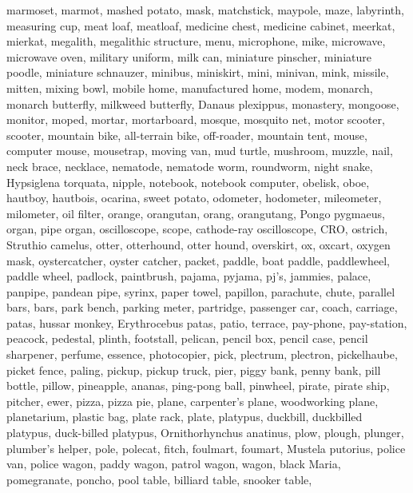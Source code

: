 \documentclass{article}
\begin{document}
{{marmoset},
{marmot},
{mashed potato},
{mask},
{matchstick},
{maypole},
{maze, labyrinth},
{measuring cup},
{meat loaf, meatloaf},
{medicine chest, medicine cabinet},
{meerkat, mierkat},
{megalith, megalithic structure},
{menu},
{microphone, mike},
{microwave, microwave oven},
{military uniform},
{milk can},
{miniature pinscher},
{miniature poodle},
{miniature schnauzer},
{minibus},
{miniskirt, mini},
{minivan},
{mink},
{missile},
{mitten},
{mixing bowl},
{mobile home, manufactured home},
{modem},
{monarch, monarch butterfly, milkweed butterfly, Danaus plexippus},
{monastery},
{mongoose},
{monitor},
{moped},
{mortar},
{mortarboard},
{mosque},
{mosquito net},
{motor scooter, scooter},
{mountain bike, all-terrain bike, off-roader},
{mountain tent},
{mouse, computer mouse},
{mousetrap},
{moving van},
{mud turtle},
{mushroom},
{muzzle},
{nail},
{neck brace},
{necklace},
{nematode, nematode worm, roundworm},
{night snake, Hypsiglena torquata},
{nipple},
{notebook, notebook computer},
{obelisk},
{oboe, hautboy, hautbois},
{ocarina, sweet potato},
{odometer, hodometer, mileometer, milometer},
{oil filter},
{orange},
{orangutan, orang, orangutang, Pongo pygmaeus},
{organ, pipe organ},
{oscilloscope, scope, cathode-ray oscilloscope, CRO},
{ostrich, Struthio camelus},
{otter},
{otterhound, otter hound},
{overskirt},
{ox},
{oxcart},
{oxygen mask},
{oystercatcher, oyster catcher},
{packet},
{paddle, boat paddle},
{paddlewheel, paddle wheel},
{padlock},
{paintbrush},
{pajama, pyjama, pj's, jammies},
{palace},
{panpipe, pandean pipe, syrinx},
{paper towel},
{papillon},
{parachute, chute},
{parallel bars, bars},
{park bench},
{parking meter},
{partridge},
{passenger car, coach, carriage},
{patas, hussar monkey, Erythrocebus patas},
{patio, terrace},
{pay-phone, pay-station},
{peacock},
{pedestal, plinth, footstall},
{pelican},
{pencil box, pencil case},
{pencil sharpener},
{perfume, essence},
{photocopier},
{pick, plectrum, plectron},
{pickelhaube},
{picket fence, paling},
{pickup, pickup truck},
{pier},
{piggy bank, penny bank},
{pill bottle},
{pillow},
{pineapple, ananas},
{ping-pong ball},
{pinwheel},
{pirate, pirate ship},
{pitcher, ewer},
{pizza, pizza pie},
{plane, carpenter's plane, woodworking plane},
{planetarium},
{plastic bag},
{plate rack},
{plate},
{platypus, duckbill, duckbilled platypus, duck-billed platypus, Ornithorhynchus anatinus},
{plow, plough},
{plunger, plumber's helper},
{pole},
{polecat, fitch, foulmart, foumart, Mustela putorius},
{police van, police wagon, paddy wagon, patrol wagon, wagon, black Maria},
{pomegranate},
{poncho},
{pool table, billiard table, snooker table},
}
\end{document}
